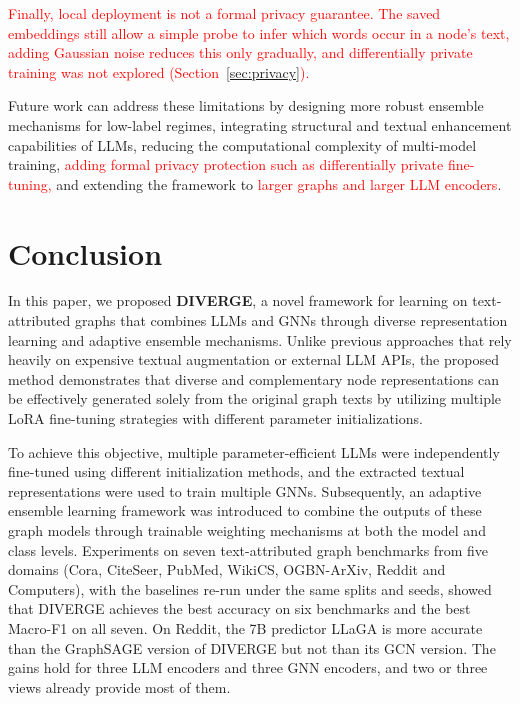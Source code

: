 \documentclass[a4paper,fleqn]{cas-sc}
\newcommand{\revone}[1]{\textcolor{red}{#1}}   %
\DeclareRobustCommand{\revcommon}[2][]{\textcolor{revshared}{#2}} %
\begin{document}
\revone{Finally, local deployment is not a formal privacy guarantee. The saved embeddings still allow a simple probe to infer which words occur in a node's text, adding Gaussian noise reduces this only gradually, and differentially private training was not explored (Section~\ref{sec:privacy}).}

Future work can address these limitations by designing more robust ensemble mechanisms for low-label regimes, integrating structural and textual enhancement capabilities of LLMs, reducing the computational complexity of multi-model training, \revone{adding formal privacy protection such as differentially private fine-tuning,} and extending the framework to \revone{larger graphs and larger LLM encoders}.

\section{Conclusion}\label{sec:Conclusion}

In this paper, we proposed \textbf{DIVERGE}, a novel framework for learning on text-attributed graphs that combines LLMs and GNNs through diverse representation learning and adaptive ensemble mechanisms. Unlike previous approaches that rely heavily on expensive textual augmentation or external LLM APIs, the proposed method demonstrates that diverse and complementary node representations can be effectively generated solely from the original graph texts by utilizing multiple LoRA fine-tuning strategies with different parameter initializations.

To achieve this objective, multiple parameter-efficient LLMs were independently fine-tuned using different initialization methods, and the extracted textual representations were used to train multiple GNNs. Subsequently, an adaptive ensemble learning framework was introduced to combine the outputs of these graph models through trainable weighting mechanisms at both the model and class levels. \revcommon[R1,R2,R4]{Experiments on seven text-attributed graph benchmarks from five domains (Cora, CiteSeer, PubMed, WikiCS, OGBN-ArXiv, Reddit and Computers), with the baselines re-run under the same splits and seeds, showed that DIVERGE achieves the best accuracy on six benchmarks and the best Macro-F1 on all seven. On Reddit, the 7B predictor LLaGA is more accurate than the GraphSAGE version of DIVERGE but not than its GCN version. The gains hold for three LLM encoders and three GNN encoders, and two or three views already provide most of them.}
\end{document}
